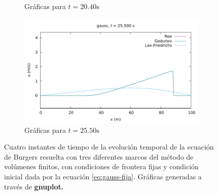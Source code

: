 \documentclass[12pt]{article}
\begin{document}
\begin{figure}[ht]
\begin{subfigure}[b]{0.4\textwidth}
 			\caption*{Gráficas para $t=20.40\unit{\second}$}
 			\label{fig:gauss-fija5}
 		\end{subfigure}
 		\hfill
 		\begin{subfigure}[b]{0.4\textwidth}
 			\includegraphics[width=\textwidth]{../burgers1DVF/results/sol_fijas/gauss/850.pdf}
 			\caption*{Gráficas para $t=25.50\unit{\second}$}
 			\label{fig:gauss-fija6}
 		\end{subfigure}
 		\caption{Cuatro instantes de tiempo de la evolución temporal de la ecuación de Burgers resuelta con tres diferentes marcos del método de volúmenes finitos, con condiciones de frontera fijas y condición inicial dada por la ecuación \ref{eq:gauss-fija}. Gráficas generadas a través de \textbf{gnuplot.}}
 		\label{fig:instantes-gauss-fija}
	\end{figure}
 
\end{document}
